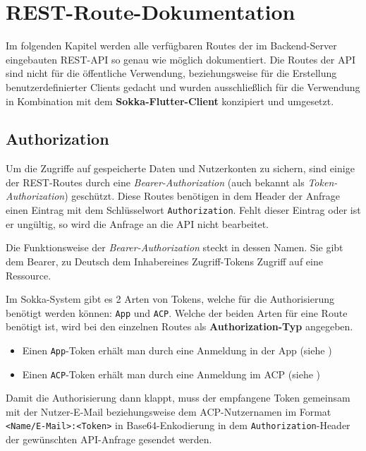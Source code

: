 \chapter{REST-Route-Dokumentation}

Im folgenden Kapitel werden alle verfügbaren Routes der im Backend-Server eingebauten REST-API so genau wie möglich dokumentiert. Die Routes der API sind nicht für die öffentliche Verwendung, beziehungsweise für die Erstellung benutzerdefinierter Clients gedacht und wurden ausschließlich für die Verwendung in Kombination mit dem \textbf{Sokka-Flutter-Client} konzipiert und umgesetzt.

\section{Authorization}

Um die Zugriffe auf gespeicherte Daten und Nutzerkonten zu sichern, sind einige der REST-Routes durch eine \textit{Bearer-Authorization} (auch bekannt als \textit{Token-Authorization}) geschützt. Diese Routes benötigen in dem Header der Anfrage einen Eintrag mit dem Schlüsselwort \lstinline{Authorization}. Fehlt dieser Eintrag oder ist er ungültig, so wird die Anfrage an die API nicht bearbeitet.

Die Funktionsweise der \textit{Bearer-Authorization} steckt in dessen Namen. Sie gibt dem \glqq Bearer\grqq, zu Deutsch dem \glqq Inhaber\grqq eines Zugriff-Tokens Zugriff auf eine Ressource. \cite{levin2019}

Im Sokka-System gibt es 2 Arten von Tokens, welche für die Authorisierung benötigt werden können: \lstinline{App} und \lstinline{ACP}. Welche der beiden Arten für eine Route benötigt ist, wird bei den einzelnen Routes als \textbf{Authorization-Typ} angegeben.

\begin{itemize}
    \item Einen \lstinline{App}-Token erhält man durch eine Anmeldung in der App (siehe )
    \item Einen \lstinline{ACP}-Token erhält man durch eine Anmeldung im ACP (siehe )
\end{itemize}

Damit die Authorisierung dann klappt, muss der empfangene Token gemeinsam mit der Nutzer-E-Mail beziehungsweise dem ACP-Nutzernamen im Format \lstinline{<Name/E-Mail>:<Token>} in Base64-Enkodierung in dem \lstinline{Authorization}-Header der gewünschten API-Anfrage gesendet werden.

